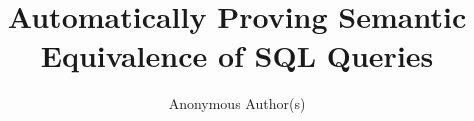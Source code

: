 \documentclass{vldb}
\title{Automatically Proving Semantic Equivalence of SQL Queries}
\author{Anonymous Author(s)}
\begin{document}

\date{}
\maketitle






%
\small

%
\end{document}
